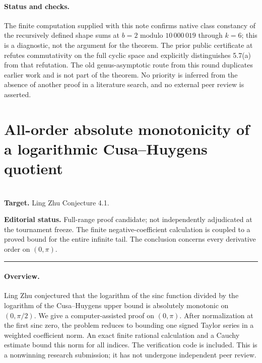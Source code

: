 \documentclass[11pt,a4paper]{article}
\begin{document}
\paragraph{Status and checks.}
The finite computation supplied with this note confirms native class constancy of the recursively defined shape sums at $b=2$ modulo $10\,000\,019$ through $k=6$; this is a diagnostic, not the argument for the theorem. The prior public certificate at \cite{R24M:prior} refutes commutativity on the full cyclic space and explicitly distinguishes 5.7(a) from that refutation. The old genus-asymptotic route from this round duplicates earlier work and is not part of the theorem. No priority is inferred from the absence of another proof in a literature search, and no external peer review is asserted.
\endgroup


\clearpage

\section{All-order absolute monotonicity of a logarithmic Cusa--Huygens quotient}
\label{section:R24S}
\\[3pt]
\noindent\textbf{Target.} Ling Zhu Conjecture 4.1.

\noindent\textbf{Editorial status.} Full-range proof candidate; not independently adjudicated at the tournament freeze. The finite negative-coefficient calculation is coupled to a proved bound for the entire infinite tail. The conclusion concerns every derivative order on $(0,\pi)$.

\smallskip\hrule\medskip



\begingroup
\newcommand{\sinc}{\operatorname{sinc}}
\setcounter{equation}{0}
\renewcommand{\theequation}{\thesection.\arabic{equation}}
\renewcommand{\theHequation}{R24S.\arabic{equation}}
\paragraph{Overview.}
Ling Zhu conjectured that the logarithm of the sinc function divided by the logarithm of the Cusa--Huygens upper bound is absolutely monotonic on $(0,\pi/2)$. We give a computer-assisted proof on $(0,\pi)$. After normalization at the first sinc zero, the problem reduces to bounding one signed Taylor series in a weighted coefficient norm. An exact finite rational calculation and a Cauchy estimate bound this norm for all indices. The verification code is included. This is a nonwinning research submission; it has not undergone independent peer review.
\end{document}
